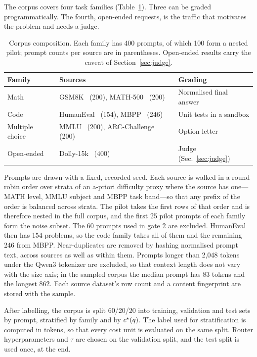 The corpus covers four task families (Table~\ref{tab:corpus}). Three can be
graded programmatically. The fourth, open-ended requests, is the traffic
that motivates the problem and needs a judge.

\begin{table}[!t]
\centering
\caption{Corpus composition. Each family has 400 prompts, of which 100 form
a nested pilot; prompt counts per source are in parentheses. Open-ended
results carry the caveat of Section~\ref{sec:judge}.}
\label{tab:corpus}
\renewcommand{\arraystretch}{1.1}
\begin{tabularx}{\columnwidth}{@{}l >{\raggedright\arraybackslash}X >{\raggedright\arraybackslash}X@{}}
\toprule
Family & Sources & Grading \\
\midrule
Math & GSM8K~\cite{cobbe2021gsm8k} (200), MATH-500~\cite{hendrycks2021math,lightman2024verify} (200) & Normalised final answer \\
Code & HumanEval~\cite{chen2021humaneval} (154), MBPP~\cite{austin2021mbpp} (246) & Unit tests in a sandbox \\
Multiple choice & MMLU~\cite{hendrycks2021mmlu} (200), ARC-Challenge~\cite{clark2018arc} (200) & Option letter \\
Open-ended & Dolly-15k~\cite{conover2023dolly} (400) & Judge (Sec.~\ref{sec:judge}) \\
\bottomrule
\end{tabularx}
\end{table}

Prompts are drawn with a fixed, recorded seed. Each source is walked in a
round-robin order over strata of an a-priori difficulty proxy where the
source has one---MATH level, MMLU subject and MBPP task band---so that any
prefix of the order is balanced across strata. The pilot takes the first
rows of that order and is therefore nested in the full corpus, and the first
25 pilot prompts of each family form the noise subset. The 60 prompts used in
gate 2 are excluded. HumanEval then has 154 problems, so the code family takes
all of them and the remaining 246 from MBPP. Near-duplicates are removed by
hashing normalised prompt text, across sources as well as within them.
Prompts longer than 2{,}048 tokens under the Qwen3 tokenizer are excluded,
so that context length does not vary with the size axis; in the sampled
corpus the median prompt has 83 tokens and the longest 862. Each source
dataset's row count and a content fingerprint are stored with the sample.

After labelling, the corpus is split 60/20/20 into training, validation and
test sets by prompt, stratified by family and by $c^{\star}(q)$. The label used
for stratification is computed in tokens, so that every cost unit is
evaluated on the same split. Router hyperparameters and $\tau$ are chosen on
the validation split, and the test split is used once, at the end.

